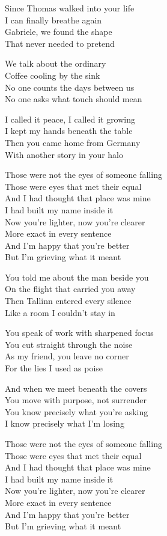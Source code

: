 \begin{lyrics}
Since Thomas walked into your life\\
I can finally breathe again\\
Gabriele, we found the shape\\
That never needed to pretend

We talk about the ordinary\\
Coffee cooling by the sink\\
No one counts the days between us\\
No one asks what touch should mean

I called it peace, I called it growing\\
I kept my hands beneath the table\\
Then you came home from Germany\\
With another story in your halo

Those were not the eyes of someone falling\\
Those were eyes that met their equal\\
And I had thought that place was mine\\
I had built my name inside it\\
Now you’re lighter, now you’re clearer\\
More exact in every sentence\\
And I’m happy that you’re better\\
But I’m grieving what it meant

You told me about the man beside you\\
On the flight that carried you away\\
Then Tallinn entered every silence\\
Like a room I couldn’t stay in

You speak of work with sharpened focus\\
You cut straight through the noise\\
As my friend, you leave no corner\\
For the lies I used as poise

And when we meet beneath the covers\\
You move with purpose, not surrender\\
You know precisely what you’re asking\\
I know precisely what I’m losing

Those were not the eyes of someone falling\\
Those were eyes that met their equal\\
And I had thought that place was mine\\
I had built my name inside it\\
Now you’re lighter, now you’re clearer\\
More exact in every sentence\\
And I’m happy that you’re better\\
But I’m grieving what it meant


\end{lyrics}
